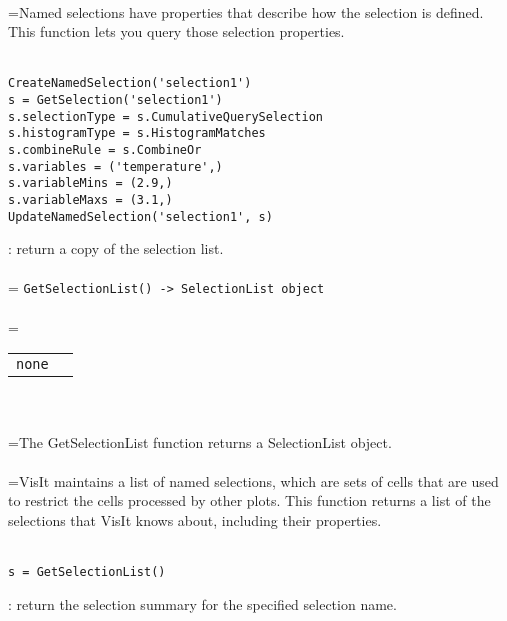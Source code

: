 \documentclass[10pt,a4paper]{report}
\begin{document}
 \\ 
\hangindent=\parindent Named selections have properties that describe how the selection is defined. This function lets you query those selection properties. \\[-3mm] 

\\[-6mm]
\begin{verbatim}CreateNamedSelection('selection1')
s = GetSelection('selection1')
s.selectionType = s.CumulativeQuerySelection
s.histogramType = s.HistogramMatches
s.combineRule = s.CombineOr
s.variables = ('temperature',)
s.variableMins = (2.9,)
s.variableMaxs = (3.1,)
UpdateNamedSelection('selection1', s)
\end{verbatim}
\newpage


{}
: return a copy of the selection list.\\[-3mm]

 \\ 
\hangindent=\parindent 
\verb!GetSelectionList() -> SelectionList object!\\ [-3mm]

 \\ 
\hangindent=\parindent 
\begin{tabular}{ll}
\verb!none! &  \\
\end{tabular} \\[-2mm]


 \\ 
\hangindent=\parindent The GetSelectionList function returns a SelectionList object. \\[-3mm] 

 \\ 
\hangindent=\parindent VisIt maintains a list of named selections, which are sets of cells that are used to restrict the cells processed by other plots. This function returns a list of the selections that VisIt knows about, including their properties. \\[-3mm] 

\\[-6mm]
\begin{verbatim}s = GetSelectionList()
\end{verbatim}
\newpage


{}
: return the selection summary for the specified selection name.\\[-3mm]
\end{document}
